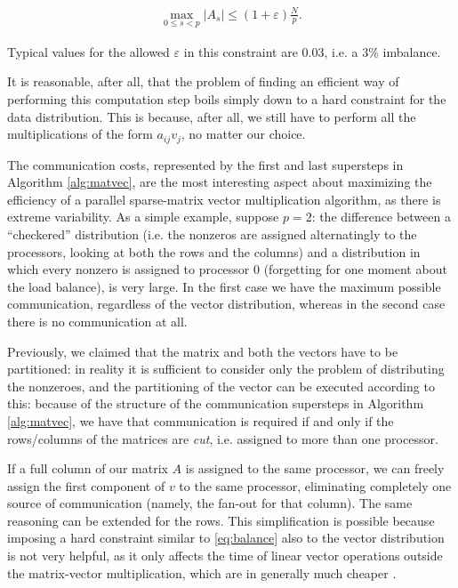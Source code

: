 \begin{align}
\max_{0 \leq s <p} |A_s| \leq (1+\varepsilon) \frac{N}{p}.
	\label{eq:balance}
\end{align}

Typical values for the allowed $\varepsilon$ in this constraint are 0.03, i.e. a 3\% imbalance.

It is reasonable, after all, that the problem of finding an efficient way of performing this computation step boils simply down to a hard constraint for the data distribution. This is because, after all, we still have to perform all the multiplications of the form $a_{ij} v_j$, no matter our choice. 

The communication costs, represented by the first and last supersteps in Algorithm \ref{alg:matvec}, are the most interesting aspect about maximizing the efficiency of a parallel sparse-matrix vector multiplication algorithm, as there is extreme variability. As a simple example, suppose $p=2$: the difference between a ``checkered'' distribution (i.e. the nonzeros are assigned alternatingly to the processors, looking at both the rows and the columns) and a distribution in which every nonzero is assigned to processor 0 (forgetting for one moment about the load balance), is very large. In the first case we have the maximum possible communication, regardless of the vector distribution, whereas in the second case there is no communication at all.

Previously, we claimed that the matrix and both the vectors have to be partitioned: in reality it is sufficient to consider only the problem of distributing the nonzeroes, and the partitioning of the vector can be executed according to this: because of the structure of the communication supersteps in Algorithm \ref{alg:matvec}, we have that communication is required if and only if the rows/columns of the matrices are \emph{cut}, i.e. assigned to more than one processor.

If a full column of our matrix $A$ is assigned to the same processor, we can freely assign the first component of $v$ to the same processor, eliminating completely one source of communication (namely, the fan-out for that column). The same reasoning can be extended for the rows. This simplification is possible because imposing a hard constraint similar to \eqref{eq:balance} also to the vector distribution is not very helpful, as it only affects the time of linear vector operations outside the matrix-vector multiplication, which are in generally much cheaper \cite[Sec.~3]{mondriaan}. 

